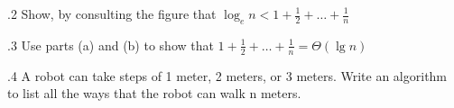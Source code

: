 \documentclass[
               handout,
               ]{beamer}
\begin{document}
        \begin{frame}[c]{\subsecname.2}
            Show, by consulting the figure that $\log_e{n}<1+\frac{1}{2}+\ldots+\frac{1}{n}$
        \end{frame}
    
        \begin{frame}[c]{\subsecname.3}
            Use parts (a) and (b) to show that $1+\frac{1}{2}+\ldots+\frac{1}{n}=\Theta(\lg{n})$
        \end{frame}
    
        \begin{frame}[c]{\subsecname.4}
            A robot can take steps of 1 meter, 2 meters, or 3 meters. Write an algorithm to list all the ways that the robot can walk n meters.
        \end{frame}
        
\end{document}
